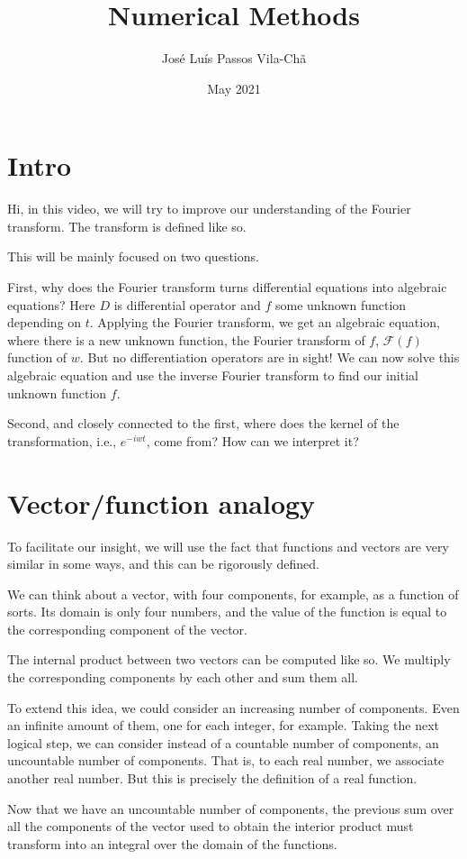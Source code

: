 \documentclass{article}
\title{Numerical Methods}
\author{José Luís Passos Vila-Chã}
\date{May 2021}
\begin{document}
\section{Intro}

Hi, in this video, we will try to improve our understanding of the Fourier transform.
The transform is defined like so.

This will be mainly focused on two questions.

First, why does the Fourier transform turns differential equations into algebraic equations?
Here $D$ is differential operator and $f$ some unknown function depending on $t$.
Applying the Fourier transform, we get an algebraic equation, where there is a new unknown function, the Fourier transform of $f$,
$\mathcal F(f)$ function of $w$.
But no differentiation operators are in sight!
We can now solve this algebraic equation and use the inverse Fourier transform to find our initial unknown function $f$.

Second, and closely connected to the first, where does the kernel of the transformation, i.e., $e^{-iwt}$, come from?
How can we interpret it?

\section{Vector/function analogy}

To facilitate our insight, we will use the fact that functions and vectors are very similar in some ways, and this can be rigorously defined.

We can think about a vector, with four components, for example, as a function of sorts.
Its domain is only four numbers, and the value of the function is equal to the corresponding component of the vector.

The internal product between two vectors can be computed like so.
We multiply the corresponding components by each other and sum them all.

To extend this idea, we could consider an increasing number of components.
Even an infinite amount of them, one for each integer, for example.
Taking the next logical step, we can consider instead of a countable number of components, an uncountable number of components.
That is, to each real number, we associate another real number.
But this is precisely the definition of a real function.

Now that we have an uncountable number of components, the previous sum over all the components of the vector used to obtain the interior product must transform into an integral over the domain of the functions.
\end{document}
